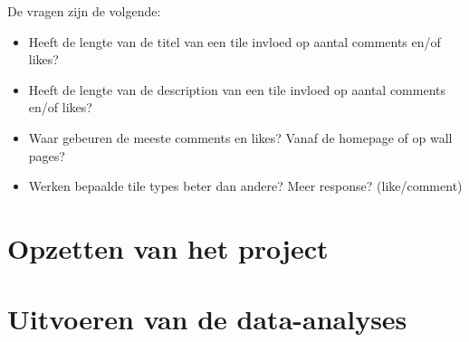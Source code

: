 De vragen zijn de volgende:
\begin{itemize}
	\item Heeft de lengte van de titel van een tile invloed op aantal comments en/of likes? 
	\item Heeft de lengte van de description van een tile invloed op aantal comments en/of likes? 
	\item Waar gebeuren de meeste comments en likes? Vanaf de homepage of op wall pages?
	\item Werken bepaalde tile types beter dan andere? Meer response? (like/comment)  
\end{itemize}

\section{Opzetten van het project}


\section{Uitvoeren van de data-analyses}
